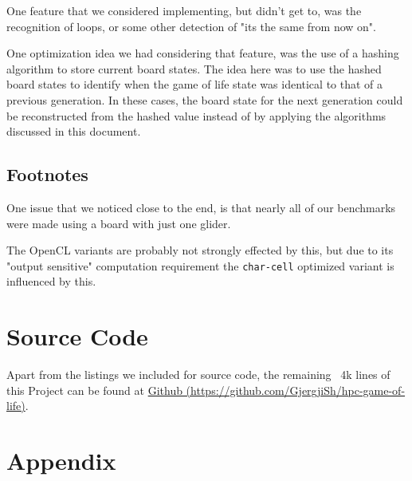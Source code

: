 \documentclass[a4paper,english,12pt,twoside=false]{scrartcl} %
\begin{document}
One feature that we considered implementing, but didn't get to, was the recognition of loops, or some other detection of "its the same from now on".

One optimization idea we had considering that feature, was the use of a hashing algorithm to store current board states.
The idea here was to use the hashed board states to identify when the game of life state was identical to that of a previous generation.
In these cases, the board state for the next generation could be reconstructed from the hashed value instead of by applying the algorithms discussed
in this document.

\subsection{Footnotes}

One issue that we noticed close to the end, is that nearly all of our benchmarks were made using a board with just one glider.

The OpenCL variants are probably not strongly effected by this,
but due to its "output sensitive" computation requirement the \verb|char-cell| optimized variant is influenced by this.

\section{Source Code}
Apart from the listings we included for source code, the remaining ~4k lines of this Project can be found at \href{https://github.com/GjergjiSh/hpc-game-of-life}{Github (https://github.com/GjergjiSh/hpc-game-of-life)}. 

\section{Appendix}
\begin{center}
    \label{lst:opencl-kernel-source}
    
\end{center}
\end{document}
